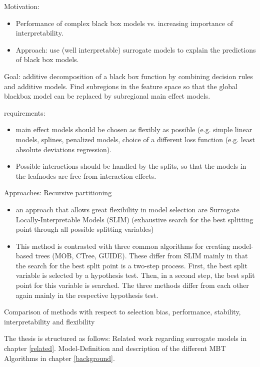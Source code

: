 Motivation:
\begin{itemize}
    \item Performance of complex black box models vs. increasing importance of interpretability.
    \item Approach: use (well interpretable) surrogate models to explain the predictions of black box models. 
\end{itemize}


Goal: additive decomposition of a black box function by combining decision rules and additive models.
Find subregions in the feature space so that the global blackbox model can be replaced by subregional main effect models.



requirements:
\begin{itemize}
    \item main effect models should be chosen as flexibly as possible (e.g. simple linear models, splines, penalized models, choice of a different loss function (e.g. least absolute deviations regression).
    \item Possible interactions should be handled by the splits, so that the models in the leafnodes are free from interaction effects.
\end{itemize}

Approaches:
Recursive partitioning
\begin{itemize}
    \item an approach that allows great flexibility in model selection are Surrogate Locally-Interpretable Models (SLIM) \citep{Hu.2020} (exhaustive search for the best splitting point through all possible splitting variables)
    \item This method is contrasted with three common algorithms for creating model-based trees (MOB, CTree, GUIDE). These differ from SLIM mainly in that the search for the best split point is a two-step process. First, the best split variable is selected by a hypothesis test. Then, in a second step, the best split point for this variable is searched. The three methods differ from each other again mainly in the respective hypothesis test.
\end{itemize}

Comparison of methods with respect to selection bias, performance, stability, interpretability and flexibility

The thesis is structured as follows:
Related work regarding surrogate models in chapter \ref{related}.
Model-Definition and description of the different MBT Algorithms in chapter \ref{background}. 

